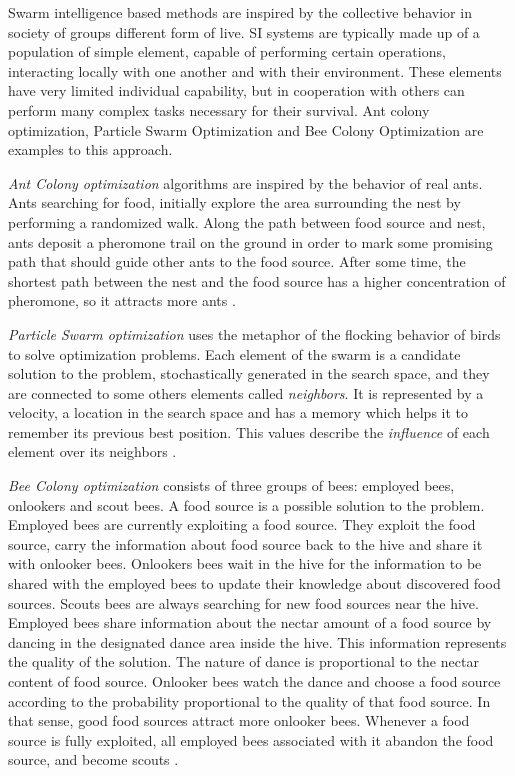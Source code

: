 Swarm intelligence based methods are inspired by the collective behavior in society of groups different form of live. SI systems are typically made up of a population of simple element, capable of performing certain operations, interacting locally with one another and with their environment. These elements have very limited individual capability, but in cooperation with others can perform many complex tasks necessary for their survival. Ant colony optimization, Particle Swarm Optimization and Bee Colony Optimization are examples to this approach.

{\it Ant Colony optimization} algorithms are inspired by the behavior of real ants. Ants searching for food, initially explore the area surrounding the nest by performing a randomized walk. Along the path between food source and nest, ants deposit a pheromone trail on the ground in order to mark some promising path that should guide other ants to the food source. After some time, the shortest path between the nest and the food source has a higher concentration of pheromone, so it attracts more ants \cite{Dorigo2010}.

\textit{Particle Swarm optimization} uses the metaphor of the flocking behavior of birds to solve optimization problems. Each element of the swarm is a candidate solution to the problem, stochastically generated in the search space, and they are connected to some others elements called \textit{neighbors}. It is represented by a velocity, a location in the search space and has a memory which helps it to remember its previous best position. This values describe the \textit{influence} of each element over its neighbors \cite{Poli2007}.

\textit{Bee Colony optimization} consists of three groups of bees: employed bees, onlookers and scout bees. A food source is a possible solution to the problem. Employed bees are currently exploiting a food source. They exploit the food source, carry the information about food source back to the hive and share it with onlooker bees. Onlookers bees wait in the hive for the information to be shared with the employed bees to update their knowledge about discovered food sources. Scouts bees are always searching for new food sources near the hive. Employed bees share information about the nectar amount of a food source by dancing in the designated dance area inside the hive. This information represents the quality of the solution. The nature of dance is proportional to the nectar content of food source. Onlooker bees watch the dance and choose a food source according to the probability proportional to the quality of that food source. In that sense, good food sources attract more onlooker bees. Whenever a food source is fully exploited, all employed bees associated with it abandon the food source, and become scouts \cite{Gao2012}.
